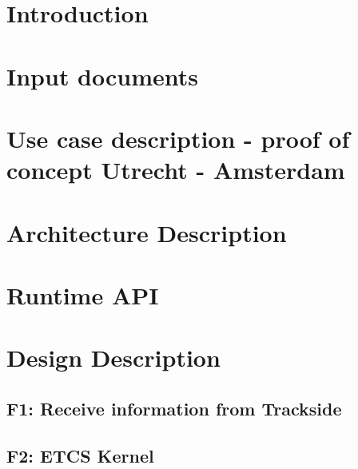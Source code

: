 \documentclass{template/openetcs_report}
\begin{document}
\setcounter{tocdepth}{3}


\tableofcontents
\listoffiguresandtables
\newpage




\mainmatter

\chapter{Introduction}



\glsaddall
\printglossaries

\chapter{Input documents}


\chapter{Use case description - proof of concept Utrecht - Amsterdam}


\chapter{Architecture Description}


\chapter{Runtime API}


\chapter{Design Description}

\section{F1: Receive information from Trackside}
\section{F2: ETCS Kernel}
\newpage
\end{document}

